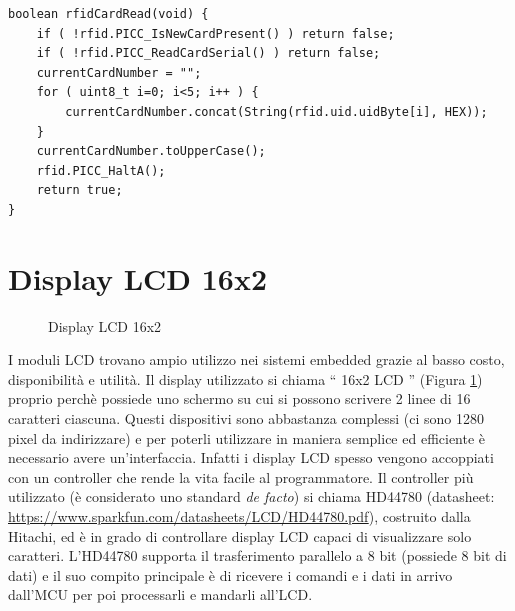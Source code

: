 \documentclass[12pt]{report}
\begin{document}
\begin{lstlisting}[caption={Procedura per leggere i tag. Essi vengono letti un byte alla volta e poi vengono concatenati in una stringa accessibile dal resto del programma}, label={lst:rfid}]
boolean rfidCardRead(void) {
	if ( !rfid.PICC_IsNewCardPresent() ) return false;
	if ( !rfid.PICC_ReadCardSerial() ) return false;
	currentCardNumber = "";
	for ( uint8_t i=0; i<5; i++ ) {
		currentCardNumber.concat(String(rfid.uid.uidByte[i], HEX));
	}
	currentCardNumber.toUpperCase();
	rfid.PICC_HaltA(); 
	return true;
}
\end{lstlisting} 

%
\section{Display LCD 16x2}
%
\begin{figure}[H]
	\caption{Display LCD 16x2}
	\label{fig:16x2}
\end{figure}

I moduli LCD trovano ampio utilizzo nei sistemi embedded grazie al basso costo, disponibilità e utilità. Il display utilizzato si chiama \textquotedblleft{} 16x2 LCD \textquotedblright{} (Figura \ref{fig:16x2}) proprio perchè possiede uno schermo su cui si possono scrivere 2 linee di 16 caratteri ciascuna. Questi dispositivi sono abbastanza complessi (ci sono 1280 pixel da indirizzare) e per poterli utilizzare in maniera semplice ed efficiente è necessario avere un'interfaccia. Infatti i display LCD spesso vengono accoppiati con un controller che rende la vita facile al programmatore. Il controller più utilizzato (è considerato uno standard \textit{de facto}) si chiama HD44780 (datasheet: \url{https://www.sparkfun.com/datasheets/LCD/HD44780.pdf}), costruito dalla Hitachi, ed è in grado di controllare display LCD capaci di visualizzare solo caratteri. L'HD44780 supporta il trasferimento parallelo a 8 bit (possiede 8 bit di dati) e il suo compito principale è di ricevere i comandi e i dati in arrivo dall'MCU per poi processarli
e mandarli all'LCD.
\end{document}
